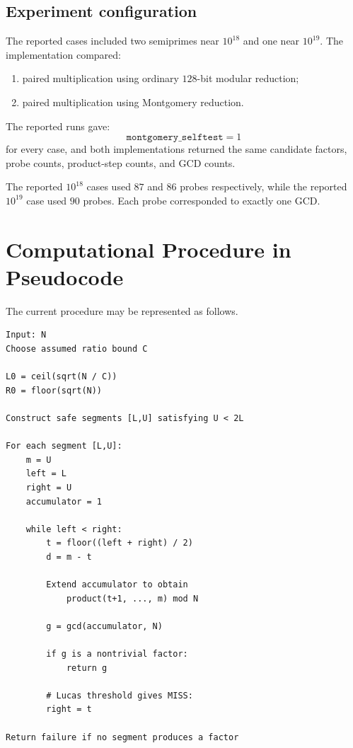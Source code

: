 \documentclass[11pt,a4paper]{article}
\begin{document}
\subsection{Experiment configuration}

The reported cases included two semiprimes near $10^{18}$ and one near $10^{19}$. The implementation compared:
\begin{enumerate}[leftmargin=2em]
    \item paired multiplication using ordinary $128$-bit modular reduction;
    \item paired multiplication using Montgomery reduction.
\end{enumerate}

The reported runs gave:
\[
\texttt{montgomery\_selftest}=1
\]
for every case, and both implementations returned the same candidate factors, probe counts, product-step counts, and GCD counts.

The reported $10^{18}$ cases used $87$ and $86$ probes respectively, while the reported $10^{19}$ case used $90$ probes. Each probe corresponded to exactly one GCD.

\section{Computational Procedure in Pseudocode}

The current procedure may be represented as follows.

\begin{lstlisting}
Input: N
Choose assumed ratio bound C

L0 = ceil(sqrt(N / C))
R0 = floor(sqrt(N))

Construct safe segments [L,U] satisfying U < 2L

For each segment [L,U]:
    m = U
    left = L
    right = U
    accumulator = 1

    while left < right:
        t = floor((left + right) / 2)
        d = m - t

        Extend accumulator to obtain
            product(t+1, ..., m) mod N

        g = gcd(accumulator, N)

        if g is a nontrivial factor:
            return g

        # Lucas threshold gives MISS:
        right = t

Return failure if no segment produces a factor
\end{lstlisting}
\end{document}
